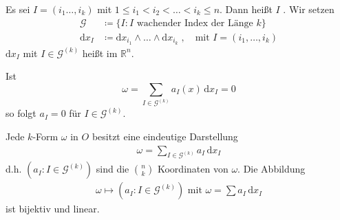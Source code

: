 \documentclass[a4paper,10pt]{scrbook}
\begin{document}
\begin{theorem}[Definition] \label{thm:12.10}
  Es sei $I = (i_1\ldots,i_k)$ mit $1 \leq i_1 < i_2 < \ldots < i_k \leq n$. Dann heißt $I$ . Wir setzen
  \begin{align*}
    \mathcal{G} &\coloneq \{ I : I \text{ wachender Index der Länge } k \} \\
    \mathrm{d}x_I &\coloneq \mathrm{d}x_{i_1} \wedge \ldots \wedge \mathrm{d}x_{i_k} \; , \quad \text{mit } I = (i_1,\ldots,i_k)
  \end{align*}
  $\mathrm{d}x_I$ mit $I \in \mathcal{G}^{(k)}$ heißt  im $\mathbb{R}^n$.
\end{theorem}

\begin{theorem}[Satz] \label{thm:12.11}
  \begin{enum-arab}
    \item Ist \[ \omega = \sum\limits_{I \in \mathcal{G}^{(k)}} a_I(x) \, \mathrm{d}x_I = 0 \] so folgt $a_I = 0$ für $I \in \mathcal{G}^{(k)}$.

    \item Jede $k$-Form $\omega$ in $O$ besitzt eine eindeutige Darstellung
    \begin{align*}
      \omega = \sum\limits_{I \in \mathcal{G}^{(k)}} a_I \, \mathrm{d}x_I
    \end{align*}
    d.h. $(a_I : I \in \mathcal{G}^{(k)})$ sind die $\binom{n}{k}$ Koordinaten von $\omega$. Die Abbildung
    \begin{align*}
      \omega \mapsto (a_I : I \in \mathcal{G}^{(k)}) \text{ mit } \omega = \sum a_I \, \mathrm{d}x_I
    \end{align*}
    ist bijektiv und linear.
  \end{enum-arab}


\end{theorem}
\end{document}
